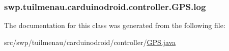 \subsubsection[{log}]{ swp.\+tuilmenau.\+carduinodroid.\+controller.\+G\+P\+S.\+log}\label{classswp_1_1tuilmenau_1_1carduinodroid_1_1controller_1_1_g_p_s_aa7191fb0e296301362a1ad86f15fa5be}


The documentation for this class was generated from the following file\+:\begin{DoxyCompactItemize}
\item 
src/swp/tuilmenau/carduinodroid/controller/\hyperlink{_g_p_s_8java}{G\+P\+S.\+java}\end{DoxyCompactItemize}
